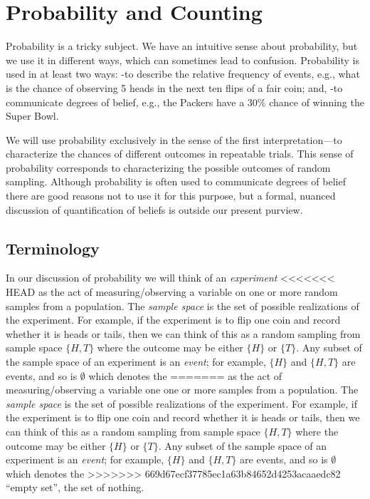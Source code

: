 \documentclass[]{book}
\begin{document}
\chapter{Probability and Counting}\label{probability-and-counting}

Probability is a tricky subject. We have an intuitive sense about
probability, but we use it in different ways, which can sometimes lead
to confusion. Probability is used in at least two ways: -to describe the
relative frequency of events, e.g., what is the chance of observing 5
heads in the next ten flips of a fair coin; and, -to communicate degrees
of belief, e.g., the Packers have a 30\% chance of winning the Super
Bowl.

We will use probability exclusively in the sense of the first
interpretation---to characterize the chances of different outcomes in
repeatable trials. This sense of probability corresponds to
characterizing the possible outcomes of random sampling. Although
probability is often used to communicate degrees of belief there are
good reasons not to use it for this purpose, but a formal, nuanced
discussion of quantification of beliefs is outside our present purview.

\section{Terminology}\label{terminology}

In our discussion of probability we will think of an \emph{experiment}
<<<<<<< HEAD
as the act of measuring/observing a variable on one or more random
samples from a population. The \emph{sample space} is the set of
possible realizations of the experiment. For example, if the experiment
is to flip one coin and record whether it is heads or tails, then we can
think of this as a random sampling from sample space \(\{H, T\}\) where
the outcome may be either \(\{H\}\) or \(\{T\}\). Any subset of the
sample space of an experiment is an \emph{event}; for example, \(\{H\}\)
and \(\{H,T\}\) are events, and so is \(\emptyset\) which denotes the
=======
as the act of measuring/observing a variable one one or more samples
from a population. The \emph{sample space} is the set of possible
realizations of the experiment. For example, if the experiment is to
flip one coin and record whether it is heads or tails, then we can think
of this as a random sampling from sample space \(\{H, T\}\) where the
outcome may be either \(\{H\}\) or \(\{T\}\). Any subset of the sample
space of an experiment is an \emph{event}; for example, \(\{H\}\) and
\(\{H,T\}\) are events, and so is \(\emptyset\) which denotes the
>>>>>>> 669d67ecf37785ec1a63b84652d4253acaaedc82
``empty set'', the set of nothing.
\end{document}
